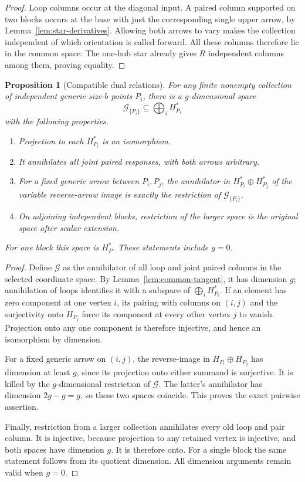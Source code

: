 \documentclass[11pt]{article}
\newtheorem{proposition}[theorem]{Proposition}
\theoremstyle{definition}
\theoremstyle{remark}
\numberwithin{equation}{section}
\begin{document}
\begin{proof}
Loop columns occur at the diagonal input. A paired column supported
on two blocks occurs at the base with just the corresponding single
upper arrow, by Lemma~\ref{lem:star-derivatives}. Allowing both
arrows to vary makes the collection independent of which orientation
is called forward. All these columns therefore lie in the common
space. The one-hub star already gives \(R\) independent columns
among them, proving equality.
\end{proof}

\begin{proposition}[Compatible dual relations]
\label{prop:compatible-relations}
For any finite nonempty collection of independent generic size-\(b\)
points \(P_i\), there is a \(g\)-dimensional space
\[
 \mathcal G_{\{P_i\}}\subseteq\bigoplus_i H_{P_i}^*
\]
with the following properties.
\begin{enumerate}
\item Projection to each \(H_{P_i}^*\) is an isomorphism.
\item It annihilates all joint paired responses, with both arrows
arbitrary.
\item For a fixed generic arrow between \(P_i,P_j\), the
annihilator in \(H_{P_i}^*\oplus H_{P_j}^*\) of the variable
reverse-arrow image is exactly the restriction of
\(\mathcal G_{\{P_i\}}\).
\item On adjoining independent blocks, restriction of the larger
space is the original space after scalar extension.
\end{enumerate}
For one block this space is \(H_P^*\). These statements include
\(g=0\).
\end{proposition}

\begin{proof}
Define \(\mathcal G\) as the annihilator of all loop and joint
paired columns in the selected coordinate space. By
Lemma~\ref{lem:common-tangent}, it has dimension \(g\); annihilation
of loops identifies it with a subspace of \(\bigoplus_i H_{P_i}^*\).
If an element has zero component at one vertex \(i\), its pairing
with columns on \((i,j)\) and the surjectivity onto \(H_{P_j}\)
force its component at every other vertex \(j\) to vanish.
Projection onto any one component is therefore injective, and hence
an isomorphism by dimension.

For a fixed generic arrow on \((i,j)\), the reverse-image in
\(H_{P_i}\oplus H_{P_j}\) has dimension at least \(g\), since
its projection onto either summand is surjective. It is killed by
the \(g\)-dimensional restriction of \(\mathcal G\). The latter's
annihilator has dimension \(2g-g=g\), so these two spaces coincide.
This proves the exact pairwise assertion.

Finally, restriction from a larger collection annihilates every old
loop and pair column. It is injective, because projection to any
retained vertex is injective, and both spaces have dimension \(g\).
It is therefore onto. For a single block the same statement follows
from its quotient dimension. All dimension arguments remain valid
when \(g=0\).
\end{proof}
\end{document}
